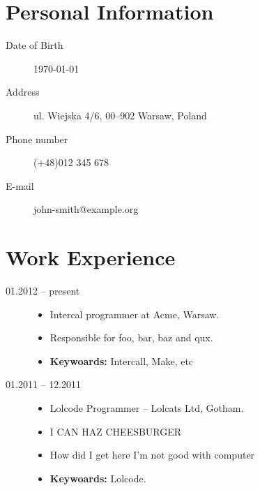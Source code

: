 \documentclass[a4paper,12pt]{cv}
\begin{document}
\mkheader


\section{Personal Information}

\begin{description}
   \item[Date of Birth] { 1970-01-01 }
   \item[Address]       { ul. Wiejska 4/6, 00--902 Warsaw, Poland }
   \item[Phone number]  { (+48)012 345 678 }
   \item[E-mail]        { john-smith@example.org }
\end{description}


\section{Work Experience}

\begin{description}
  \item[01.2012 -- present]{
     \begin{itemize}
        \item {
           Intercal programmer at Acme, Warsaw. 
        }
        \item {
           Responsible for foo, bar, baz and qux.
        }
        \item {
           {\bf Keywoards:} Intercall, Make, etc
        }
     \end{itemize}
   }
\item[01.2011 -- 12.2011]{
   \begin{itemize}
      \item {
         Lolcode Programmer -- Lolcats Ltd, Gotham. 
      }
      \item {
         I CAN HAZ CHEESBURGER
      }
      \item {
         How did I get here I'm not good with computer
      }
      \item {
         {\bf Keywoards:} Lolcode.
      }
   \end{itemize}
}
\end{description}

\end{document}
